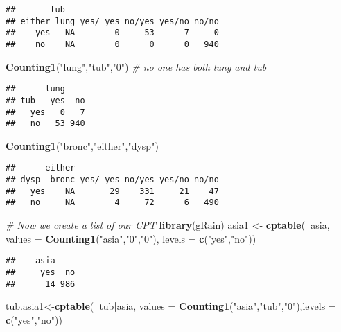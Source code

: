 \documentclass[
]{article}
\newenvironment{Shaded}{\begin{snugshade}}{\end{snugshade}}
\newcommand{\CommentTok}[1]{\textcolor[rgb]{0.56,0.35,0.01}{\textit{#1}}}
\newcommand{\DataTypeTok}[1]{\textcolor[rgb]{0.13,0.29,0.53}{#1}}
\newcommand{\KeywordTok}[1]{\textcolor[rgb]{0.13,0.29,0.53}{\textbf{#1}}}
\newcommand{\NormalTok}[1]{#1}
\newcommand{\OperatorTok}[1]{\textcolor[rgb]{0.81,0.36,0.00}{\textbf{#1}}}
\newcommand{\StringTok}[1]{\textcolor[rgb]{0.31,0.60,0.02}{#1}}
\begin{document}
\begin{verbatim}
##       tub
## either lung yes/ yes no/yes yes/no no/no
##    yes   NA        0     53      7     0
##    no    NA        0      0      0   940
\end{verbatim}

\begin{Shaded}
\begin{Highlighting}[]
\KeywordTok{Counting1}\NormalTok{(}\StringTok{"lung"}\NormalTok{,}\StringTok{"tub"}\NormalTok{,}\StringTok{"0"}\NormalTok{) }\CommentTok{# no one has both lung and tub }
\end{Highlighting}
\end{Shaded}

\begin{verbatim}
##      lung
## tub   yes  no
##   yes   0   7
##   no   53 940
\end{verbatim}

\begin{Shaded}
\begin{Highlighting}[]
\KeywordTok{Counting1}\NormalTok{(}\StringTok{"bronc"}\NormalTok{,}\StringTok{"either"}\NormalTok{,}\StringTok{"dysp"}\NormalTok{)}
\end{Highlighting}
\end{Shaded}

\begin{verbatim}
##      either
## dysp  bronc yes/ yes no/yes yes/no no/no
##   yes    NA       29    331     21    47
##   no     NA        4     72      6   490
\end{verbatim}

\begin{Shaded}
\begin{Highlighting}[]
\CommentTok{# Now we create a list of our CPT}
\KeywordTok{library}\NormalTok{(gRain)}
\NormalTok{asia1 <-}\StringTok{ }\KeywordTok{cptable}\NormalTok{(}\OperatorTok{~}\NormalTok{asia, }\DataTypeTok{values =} \KeywordTok{Counting1}\NormalTok{(}\StringTok{"asia"}\NormalTok{,}\StringTok{"0"}\NormalTok{,}\StringTok{"0"}\NormalTok{), }\DataTypeTok{levels =} \KeywordTok{c}\NormalTok{(}\StringTok{"yes"}\NormalTok{,}\StringTok{"no"}\NormalTok{))}
\end{Highlighting}
\end{Shaded}

\begin{verbatim}
##    asia
##     yes  no
##      14 986
\end{verbatim}

\begin{Shaded}
\begin{Highlighting}[]
\NormalTok{tub.asia1<-}\KeywordTok{cptable}\NormalTok{(}\OperatorTok{~}\NormalTok{tub}\OperatorTok{|}\NormalTok{asia, }\DataTypeTok{values =} \KeywordTok{Counting1}\NormalTok{(}\StringTok{"asia"}\NormalTok{,}\StringTok{"tub"}\NormalTok{,}\StringTok{"0"}\NormalTok{),}\DataTypeTok{levels =} \KeywordTok{c}\NormalTok{(}\StringTok{"yes"}\NormalTok{,}\StringTok{"no"}\NormalTok{))}
\end{Highlighting}
\end{Shaded}
\end{document}
